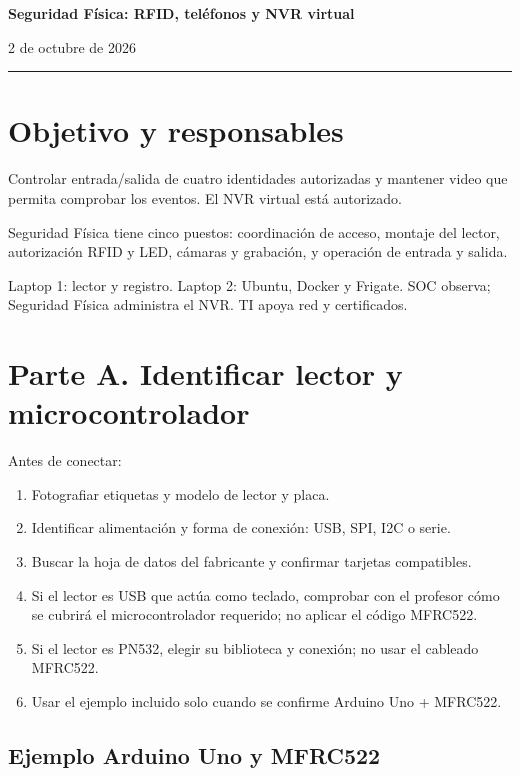 \documentclass[12pt,a4paper]{article}
\begin{document}
{\LARGE\bfseries Seguridad Física: RFID, teléfonos y NVR virtual\par}\vspace{6pt}
2 de octubre de 2026\par\hrule\vspace{10pt}
\section*{Objetivo y responsables}
Controlar entrada/salida de cuatro identidades autorizadas y mantener video que permita comprobar los eventos. El NVR virtual está autorizado.\par
Seguridad Física tiene cinco puestos: coordinación de acceso, montaje del lector, autorización RFID y LED, cámaras y grabación, y operación de entrada y salida.\par
Laptop 1: lector y registro. Laptop 2: Ubuntu, Docker y Frigate. SOC observa; Seguridad Física administra el NVR. TI apoya red y certificados.\par
{}\section*{Parte A. Identificar lector y microcontrolador}
Antes de conectar:\par
\begin{enumerate}
\item Fotografiar etiquetas y modelo de lector y placa.
\item Identificar alimentación y forma de conexión: USB, SPI, I2C o serie.
\item Buscar la hoja de datos del fabricante y confirmar tarjetas compatibles.
\item Si el lector es USB que actúa como teclado, comprobar con el profesor cómo se cubrirá el microcontrolador requerido; no aplicar el código MFRC522.
\item Si el lector es PN532, elegir su biblioteca y conexión; no usar el cableado MFRC522.
\item Usar el ejemplo incluido solo cuando se confirme Arduino Uno + MFRC522.
\end{enumerate}
\subsection*{Ejemplo Arduino Uno y MFRC522}
\end{document}
